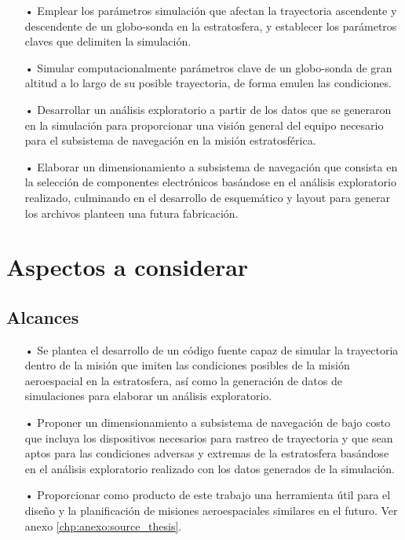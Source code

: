 \begin{itemize}

    \item[•] Emplear los parámetros simulación que afectan la trayectoria ascendente y descendente de un globo-sonda en la estratosfera, y establecer los parámetros claves que delimiten la simulación.

    \item[•] Simular computacionalmente parámetros clave de un globo-sonda de gran altitud a lo largo de su posible trayectoria, de forma emulen las condiciones.

    \item[•] Desarrollar un análisis exploratorio a partir de los datos que se generaron en la simulación para proporcionar una visión general del equipo necesario para el subsistema de navegación en la misión estratosférica.

    \item[•] Elaborar un dimensionamiento a subsistema de navegación que consista en la selección de componentes electrónicos basándose en el análisis exploratorio realizado, culminando en el desarrollo de esquemático y layout para generar los archivos planteen una futura fabricación.

\end{itemize}

\newpage

\section{Aspectos a considerar} \label{sct:intro:consideraciones}

\subsection{Alcances}

\begin{itemize}

    \item[•] Se plantea el desarrollo de un código fuente capaz de simular la trayectoria dentro de la misión que imiten las condiciones posibles de la misión aeroespacial en la estratosfera, así como la generación de datos de simulaciones para elaborar un análisis exploratorio. 

    \item[•] Proponer un dimensionamiento a subsistema de navegación de bajo costo que incluya los dispositivos necesarios para rastreo de trayectoria y que sean aptos para las condiciones adversas y extremas de la estratosfera basándose en el análisis exploratorio realizado con los datos generados de la simulación.

    \item[•] Proporcionar como producto de este trabajo una herramienta útil para el diseño y la planificación de misiones aeroespaciales similares en el futuro. Ver anexo \ref{chp:anexo:source_thesis}.


\end{itemize} 

